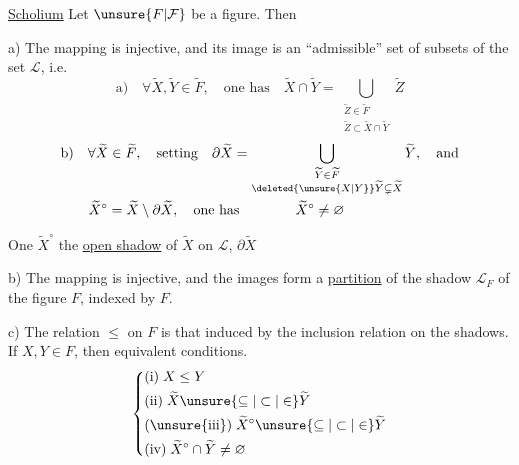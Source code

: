 \uline{Scholium}  Let $\unsure{F|\mathcal F}$ be a figure. Then

a) The mapping
is injective, and its image  is an ``admissible'' set of subsets of the set $\mathcal L$, i.e.
\[
\text{a)}\quad\forall\widetilde X,\widetilde Y\in\widetilde F,\quad\text{one has}\quad
\widetilde X\cap\widetilde Y=\bigcup_{\substack{\widetilde Z\in\widetilde F\\ \widetilde Z\subset\widetilde X\cap\widetilde Y}}\widetilde Z
\]
\[
\begin{aligned}
&\text{b)}\quad \forall\widetilde X\in\widetilde F,\quad\text{setting}\quad
\partial\widetilde X=\bigcup_{\substack{\widetilde Y\in\widetilde F\\ \deleted{\unsure{X|Y}}\widetilde Y\subsetneq\widetilde X}}\widetilde Y,\quad\text{and}\\
&\qquad\widetilde X^{\circ}=\widetilde X\setminus\partial\widetilde X,\quad\text{one has}\qquad\qquad \widetilde X^\circ\neq\varnothing
\end{aligned}
\]

One   $\widetilde X^\circ$ the \uline{open shadow} of $\widetilde X$ on $\mathcal L$, $\partial\widetilde X$  

b) The mapping
is injective, and  the images form a \uline{partition} of the shadow $\mathcal L_F$ of the figure $F$, indexed by $F$.

c)  The relation $\leq$ on $F$ is that induced by the inclusion relation on the shadows. If $X,Y\in F$, then equivalent conditions.
\[
\left\{\begin{aligned}
&\text{(i)}\;X\leq Y\\
&\text{(ii)}\;\widetilde X\unsure{\subseteq|\subset|\in}\widetilde Y\\
&\text{(\unsure{iii})}\;\widetilde X^\circ\unsure{\subseteq|\subset|\in}\widetilde Y\\
&\text{(iv)}\;\widetilde X^\circ\cap\widetilde Y\neq\varnothing
\end{aligned}\right.
\]
